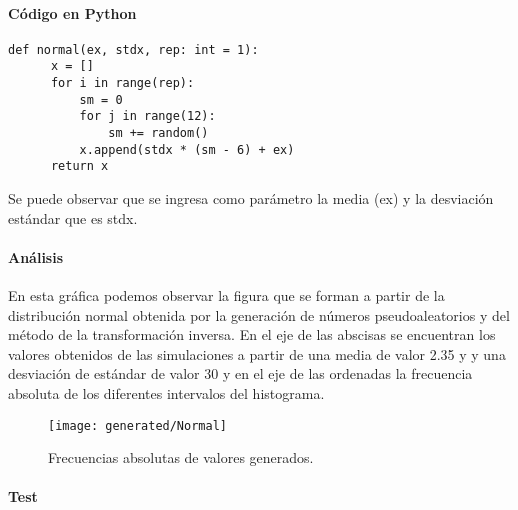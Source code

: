 \documentclass{article}
\begin{document}
  \paragraph{Código en Python}
  \begin{lstlisting}[style = Python]
    def normal(ex, stdx, rep: int = 1):
      x = []
      for i in range(rep):
          sm = 0
          for j in range(12):
              sm += random()
          x.append(stdx * (sm - 6) + ex)
      return x
  \end{lstlisting}
  Se puede observar que se ingresa como parámetro la media (ex) y la desviación estándar que es stdx.

  \paragraph{Análisis\newline}
  En esta gráfica podemos observar la figura que se forman a partir de la distribución normal obtenida por
  la generación de números pseudoaleatorios y del método de la transformación inversa. En el eje de las abscisas se
  encuentran los valores obtenidos de las simulaciones a partir de una media de valor 2.35 y y una desviación de estándar
  de valor 30 y en el eje de las ordenadas la frecuencia absoluta de los diferentes intervalos del histograma.
  \begin{figure}[h]
    \centering
    \texttt{[image: generated/Normal]}
    \caption{Frecuencias absolutas de valores generados.}
  \end{figure}
  \newpage

  \paragraph{Test\newline}
\end{document}
